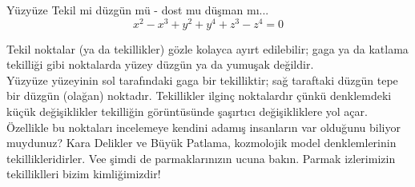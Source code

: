 \begin{surferPage}{Yüzyüze}
Tekil mi düzgün mü - dost mu düşman mı...\\
\smallskip
\[x^2	- x^3+ y^2+ y^4+ z^3- z^4	=  0\]

\vspace{0.3cm}
Tekil noktalar (ya da tekillikler) gözle kolayca ayırt edilebilir; gaga ya da katlama tekilliği gibi noktalarda yüzey düzgün ya da  yumuşak değildir. \\
\vspace{0.3cm}
Yüzyüze yüzeyinin sol tarafındaki gaga bir tekilliktir; sağ taraftaki düzgün tepe bir düzgün (olağan) noktadır. Tekillikler ilginç noktalardır çünkü denklemdeki küçük değişiklikler tekilliğin görüntüsünde şaşırtıcı değişikliklere yol açar. \\

\vspace{0.3cm}
Özellikle bu noktaları incelemeye kendini adamış insanların var olduğunu biliyor muydunuz?
Kara Delikler ve Büyük Patlama, kozmolojik model denklemlerinin tekillikleridirler. Vee şimdi de parmaklarınızın ucuna bakın. Parmak izlerimizin tekilliklleri bizim kimliğimizdir!
\end{surferPage}
